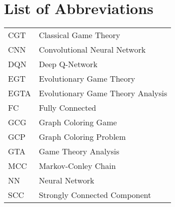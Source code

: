 \section*{List of Abbreviations}

\begin{table}[h]
    \raggedright
    \begin{tabular}{l l}
        CGT  & Classical Game Theory \\
        CNN  & Convolutional Neural Network \\
        DQN  & Deep Q-Network \\
        EGT  & Evolutionary Game Theory \\
        EGTA & Evolutionary Game Theory Analysis \\
        FC   & Fully Connected \\
        GCG  & Graph Coloring Game \\
        GCP  & Graph Coloring Problem \\
        GTA  & Game Theory Analysis \\
        MCC  & Markov-Conley Chain \\
        NN   & Neural Network \\
        SCC  & Strongly Connected Component \\
    \end{tabular}
\end{table}